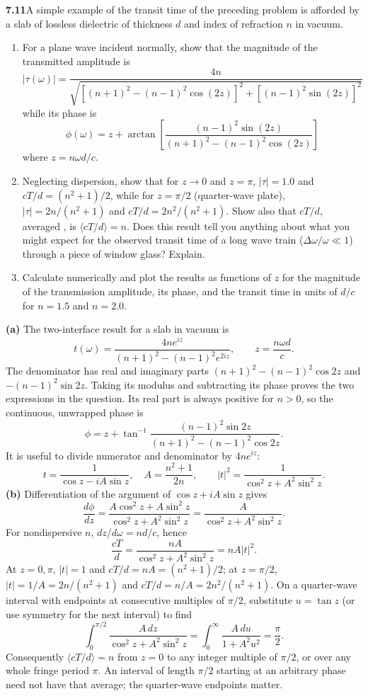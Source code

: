 \par\bigskip
\noindent\textbf{7.11}\quad A simple example of the transit time of the preceding problem is afforded by a slab of lossless dielectric of thickness $d$ and index of refraction $n$ in vacuum.
\begin{enumerate}
\item[(a)] For a plane wave incident normally, show that the magnitude of the transmitted amplitude is
\[
|\tau(\omega)|=\frac{4n}{\sqrt{[(n+1)^{2}-(n-1)^{2}\cos(2z)]^{2}+[(n-1)^{2}\sin(2z)]^{2}}}
\]
while its phase is
\[
\phi(\omega)=z+\arctan\!\left[\frac{(n-1)^{2}\sin(2z)}{(n+1)^{2}-(n-1)^{2}\cos(2z)}\right]
\]
where $z=n\omega d/c$.
\item[(b)] Neglecting dispersion, show that for $z\to0$ and $z=\pi$, $|\tau|=1.0$ and $cT/d=(n^{2}+1)/2$, while for $z=\pi/2$ (quarter-wave plate), $|\tau|=2n/(n^{2}+1)$ and $cT/d=2n^{2}/(n^{2}+1)$. Show also that $cT/d$, averaged , is $\langle cT/d\rangle=n$. Does this result tell you anything about what you might expect for the observed transit time of a long wave train ($\Delta\omega/\omega\ll1$) through a piece of window glass? Explain.
\item[(c)] Calculate numerically and plot the results as functions of $z$ for the magnitude of the transmission amplitude, its phase, and the transit time in units of $d/c$ for $n=1.5$ and $n=2.0$.
\end{enumerate}
\solution
\textbf{(a)} The two-interface result for a slab in vacuum is
\[
t(\omega)=\frac{4ne^{iz}}{(n+1)^2-(n-1)^2e^{2iz}},\qquad
z=\frac{n\omega d}{c}.
\]
The denominator has real and imaginary parts
$(n+1)^2-(n-1)^2\cos2z$ and $-(n-1)^2\sin2z$.
Taking its modulus and subtracting its phase proves the two
expressions in the question. Its real part is always positive for
$n>0$, so the continuous, unwrapped phase is
\[
\phi=z+\tan^{-1}\frac{(n-1)^2\sin2z}
 {(n+1)^2-(n-1)^2\cos2z}.
\]
It is useful to divide numerator and denominator by $4ne^{iz}$:
\[
t=\frac1{\cos z-iA\sin z},\quad
A=\frac{n^2+1}{2n},\qquad
|t|^2=\frac1{\cos^2z+A^2\sin^2z}.
\]
\textbf{(b)} Differentiation of the argument of
$\cos z+iA\sin z$ gives
\[
\frac{d\phi}{dz}
=\frac{A\cos^2z+A\sin^2z}{\cos^2z+A^2\sin^2z}
=\frac{A}{\cos^2z+A^2\sin^2z}.
\]
For nondispersive $n$, $dz/d\omega=nd/c$, hence
\[
\boxed{\frac{cT}{d}=\frac{nA}{\cos^2z+A^2\sin^2z}=nA|t|^2.}
\]
At $z=0,\pi$, $|t|=1$ and $cT/d=nA=(n^2+1)/2$;
at $z=\pi/2$, $|t|=1/A=2n/(n^2+1)$ and
$cT/d=n/A=2n^2/(n^2+1)$.
On a quarter-wave interval with endpoints at consecutive multiples
of $\pi/2$, substitute $u=\tan z$ (or use symmetry for the next
interval) to find
\[
\int_0^{\pi/2}\frac{A\,dz}{\cos^2z+A^2\sin^2z}
=\int_0^\infty\frac{A\,du}{1+A^2u^2}=\frac\pi2.
\]
Consequently $\langle cT/d\rangle=n$ from $z=0$ to any integer
multiple of $\pi/2$, or over any whole fringe period $\pi$.
An interval of length $\pi/2$ starting at an arbitrary phase need
not have that average; the quarter-wave endpoints matter.

